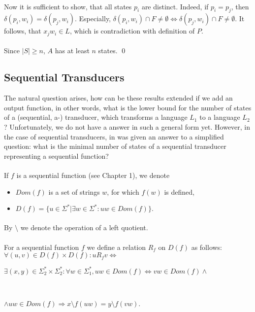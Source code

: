 \paragraph{}
Now it is sufficient to show, that all states $p_{i}$ are distinct. Indeed, if $p_{i} = p_{j}$, then $\delta (p_{i}, w_{i}) = \delta (p_{j}, w_{i})$. Especially, $\delta (p_{i}, w_{i}) \cap F \neq \emptyset \Leftrightarrow \delta (p_{j}, w_{i}) \cap F\neq \emptyset $. It follows, that $x_{j}w_{i} \in L$, which is contradiction with definition of $P$.

\paragraph{}
Since $|S| \geq n$, $A$ has at least $n$ states. \qed

\subsection{Sequential Transducers}
The natural question arises, how can be these results extended if we add an output function, in other words, what is the lower bound for the number of states of a (sequential, a-) transducer, which transforms a language $L_{1}$ to a language $L_{2}$? Unfortunately, we do not have a answer in such a general form yet. However, in the case of sequential transducers, in \cite{moh:min} was given an answer to a simplified question: what is the minimal number of states of a sequential transducer representing a sequential function?

\paragraph{}
\oznacenie If $f$ is a sequential function (see Chapter 1), we denote
\begin{itemize}
\item $Dom(f)$ is a set of strings $w$, for which $f(w)$ is defined,
\item $D(f) = \{ u \in \Sigma ^{*} | \exists w \in \Sigma ^{*}: uw \in Dom(f) \} $.
\end{itemize}

\paragraph{}
\oznacenie By $\setminus $ we denote the operation of a left quotient.

\paragraph{}
 For a sequential function $f$  we define a relation $R_{f}$ on $D(f)$ as follows:\\
$\forall (u, v) \in D(f) \times D(f): u R_{f} v \iff$ \\
\centerline{$\exists (x, y) \in \Sigma_{2}^* \times \Sigma_{2}^*: \forall w \in \Sigma_{1}^{*}, uw \in Dom(f) \Leftrightarrow vw \in Dom(f) \wedge $}\\
\centerline{$\wedge uw \in Dom(f) \Rightarrow x\setminus f(uw) = y\setminus f(vw)$.}

